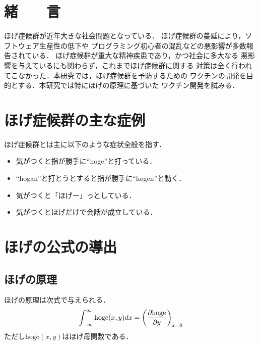 
\usepackage{jtygm}
\usepackage{ikuo}
\newcommand{\FIGDIR}{./fig}	%

\begin{small}
\section{緒　　言}
ほげ症候群が近年大きな社会問題となっている\cite{Ikuo:doctor}．
ほげ症候群の蔓延により，ソフトウェア生産性の低下や
プログラミング初心者の混乱などの悪影響が多数報告されている．
ほげ症候群が重大な精神疾患であり，かつ社会に多大なる
悪影響を与えているにも関わらず，これまでほげ症候群に関する
対策は全く行われてこなかった．本研究では，ほげ症候群を予防するための
ワクチンの開発を目的とする．本研究では特にほげの原理に基づいた
ワクチン開発を試みる．
\section{ほげ症候群の主な症例}
ほげ症候群とは主に以下のような症状全般を指す\cite{Hondo:hohoge2006}．
\begin{itemize}
\item 気がつくと指が勝手に``hoge''と打っている．
\item ``hogan''と打とうとすると指が勝手に``hogen''と動く．
\item 気がつくと「ほげー」っとしている．
\item 気がつくとほげだけで会話が成立している．
\end{itemize}
\section{ほげの公式の導出}
\subsection{ほげの原理}
ほげの原理は次式で与えられる\cite{Kawamura:hogege2010}．
\begin{eqnarray}
\int_{-\infty}^\infty \mathrm{hoge}(x,y) dx = \left( \frac{\partial \mathrm{hoge}}{\partial y} \label{hoge} \right)_{x = 0}
\end{eqnarray}
ただし$\mathrm{hoge}(x,y)$はほげ母関数である．

\end{small}
